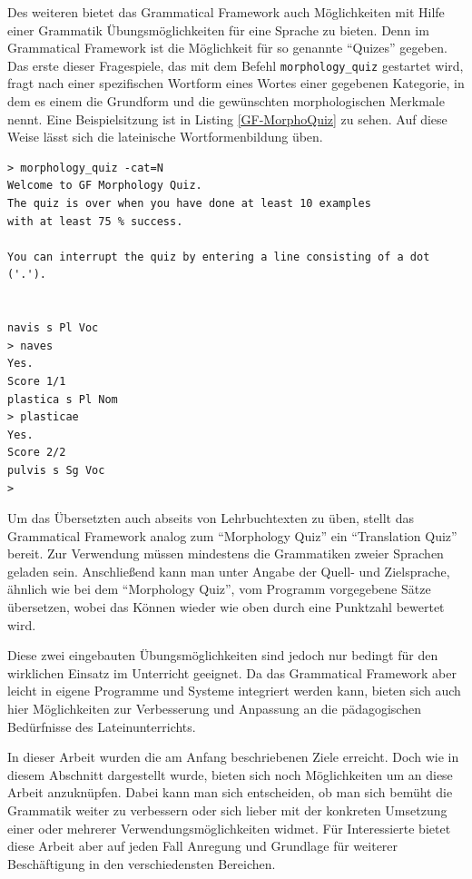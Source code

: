 Des weiteren bietet das Grammatical Framework auch Möglichkeiten mit Hilfe einer Grammatik Übungsmöglichkeiten für eine Sprache zu bieten. Denn im Grammatical Framework ist die Möglichkeit für so genannte ``Quizes'' gegeben. Das erste dieser Fragespiele, das mit dem Befehl \texttt{morphology\_quiz} gestartet wird, fragt nach einer spezifischen Wortform eines Wortes einer gegebenen Kategorie, in dem es einem die Grundform und die gewünschten morphologischen Merkmale nennt. Eine Beispielsitzung ist in Listing \ref{GF-MorphoQuiz} zu sehen. Auf diese Weise lässt sich die lateinische Wortformenbildung üben.
\begin{lstlisting}[float=h!tp,caption={Eine Beispielsitzung des Grammatical Framework Morphology Quiz},label={GF-MorphoQuiz},basicstyle=\small]
> morphology_quiz -cat=N
Welcome to GF Morphology Quiz.
The quiz is over when you have done at least 10 examples
with at least 75 % success.

You can interrupt the quiz by entering a line consisting of a dot ('.').


navis s Pl Voc
> naves
Yes.
Score 1/1
plastica s Pl Nom
> plasticae
Yes.
Score 2/2
pulvis s Sg Voc
>
\end{lstlisting}
Um das Übersetzten auch abseits von Lehrbuchtexten zu üben, stellt das Grammatical Framework analog zum ``Morphology Quiz'' ein ``Translation Quiz'' bereit. Zur Verwendung müssen mindestens die Grammatiken zweier Sprachen geladen sein. Anschließend kann man unter Angabe der Quell- und Zielsprache, ähnlich wie bei dem ``Morphology Quiz'', vom Programm vorgegebene Sätze übersetzen, wobei das Können wieder wie oben durch eine Punktzahl bewertet wird. \par
Diese zwei eingebauten Übungsmöglichkeiten sind jedoch nur bedingt für den wirklichen Einsatz im Unterricht geeignet. Da das Grammatical Framework aber leicht in eigene Programme und Systeme integriert werden kann, bieten sich auch hier Möglichkeiten zur Verbesserung und Anpassung an die pädagogischen Bedürfnisse des Lateinunterrichts.\par
In dieser Arbeit wurden die am Anfang beschriebenen Ziele erreicht. Doch wie in diesem Abschnitt dargestellt wurde, bieten sich noch Möglichkeiten um an diese Arbeit anzuknüpfen. Dabei kann man sich entscheiden, ob man sich bemüht die Grammatik weiter zu verbessern oder sich lieber mit der konkreten Umsetzung einer oder mehrerer Verwendungsmöglichkeiten widmet. Für Interessierte bietet diese Arbeit aber auf jeden Fall Anregung und Grundlage für weiterer Beschäftigung in den verschiedensten Bereichen.
